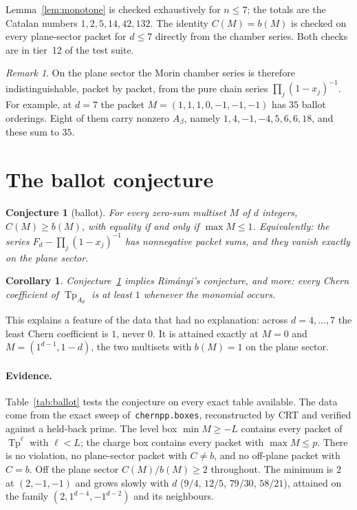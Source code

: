 \documentclass[11pt,a4paper]{article}
\DeclareMathOperator{\Tp}{Tp}
\theoremstyle{plain}
\newtheorem{corollary}[theorem]{Corollary}
\newtheorem{conjecture}[theorem]{Conjecture}
\theoremstyle{definition}
\theoremstyle{remark}
\newtheorem{remark}[theorem]{Remark}
\begin{document}
Lemma~\ref{lem:monotone} is checked exhaustively for $n \le 7$; the totals are the Catalan numbers
$1, 2, 5, 14, 42, 132$. The identity $C(M) = b(M)$ is checked on every plane-sector packet for
$d \le 7$ directly from the chamber series. Both checks are in tier~12 of the test suite.

\begin{remark}
On the plane sector the Morin chamber series is therefore indistinguishable, packet by packet,
from the pure chain series $\prod_j (1 - x_j)^{-1}$. For example, at $d = 7$ the packet
$M = (1,1,1,0,-1,-1,-1)$ has $35$ ballot orderings. Eight of them carry nonzero $A_\beta$, namely
$1, 4, -1, -4, 5, 6, 6, 18$, and these sum to $35$.
\end{remark}

\section{The ballot conjecture}

\begin{conjecture}[ballot]\label{conj:ballot}
For every zero-sum multiset $M$ of $d$ integers, $C(M) \ge b(M)$, with equality if and only if
$\max M \le 1$. Equivalently: the series $F_d - \prod_j (1 - x_j)^{-1}$ has nonnegative packet sums,
and they vanish exactly on the plane sector.
\end{conjecture}

\begin{corollary}
Conjecture~\ref{conj:ballot} implies Rim\'anyi's conjecture, and more: every Chern coefficient of
$\Tp_{A_d}$ is at least $1$ whenever the monomial occurs.
\end{corollary}

This explains a feature of the data that had no explanation: across $d = 4, \dots, 7$ the least Chern
coefficient is $1$, never $0$. It is attained exactly at $M = 0$ and $M = (1^{d-1}, 1-d)$, the two
multisets with $b(M) = 1$ on the plane sector.



\paragraph{Evidence.} Table~\ref{tab:ballot} tests the conjecture on every exact table available.
The data come from the exact sweep of~\texttt{chernpp.boxes}, reconstructed by CRT and verified
against a held-back prime. The level box $\min M \ge -L$ contains every packet of $\Tp^{\ell}$ with
$\ell < L$; the charge box contains every packet with $\max M \le p$. There is no violation, no
plane-sector packet with $C \ne b$, and no off-plane packet with $C = b$. Off the plane sector
$C(M)/b(M) \ge 2$ throughout. The minimum is $2$ at $(2,-1,-1)$ and grows slowly with $d$
($9/4$, $12/5$, $79/30$, $58/21$), attained on the family $(2, 1^{d-4}, -1^{d-2})$ and its
neighbours.
\end{document}
